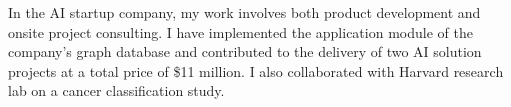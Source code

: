 

\begin{cvparagraph}

In the AI startup company, my work involves both product development and onsite project consulting. I have implemented the application module of the company's graph database and contributed to the delivery of two AI solution projects at a total price of \$11 million. I also collaborated with Harvard research lab on a cancer classification study.
\end{cvparagraph}
